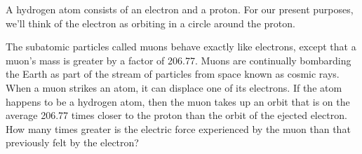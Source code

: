 A hydrogen atom consists of an electron and a proton. For our
        present purposes, we'll think of the electron as orbiting in
        a circle around the proton.
        
        The subatomic particles called muons behave exactly like
        electrons, except that a muon's mass is greater by a factor
        of 206.77.  Muons are continually bombarding the Earth as
        part of the stream of particles from space known as cosmic
        rays.  When a muon strikes an atom, it can displace one of
        its electrons.  If the atom happens to be a hydrogen atom,
        then the muon takes up an orbit that is on the average
        206.77 times closer to the proton than the orbit of the
        ejected electron.  How many times greater is the electric
        force experienced by the muon than that previously
        felt by the electron?
